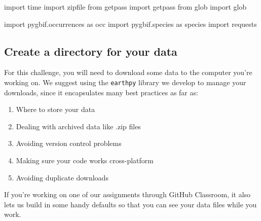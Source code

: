 \documentclass[
]{report}
\newenvironment{Shaded}{\begin{snugshade}}{\end{snugshade}}
\newcommand{\ImportTok}[1]{\textcolor[rgb]{0.00,0.46,0.62}{#1}}
\newcommand{\NormalTok}[1]{\textcolor[rgb]{0.00,0.23,0.31}{#1}}
\providecommand{\tightlist}{%
  \setlength{\itemsep}{0pt}\setlength{\parskip}{0pt}}
\begin{document}
\begin{Shaded}
\begin{Highlighting}[]
\ImportTok{import}\NormalTok{ time}
\ImportTok{import}\NormalTok{ zipfile}
\ImportTok{from}\NormalTok{ getpass }\ImportTok{import}\NormalTok{ getpass}
\ImportTok{from}\NormalTok{ glob }\ImportTok{import}\NormalTok{ glob}

\ImportTok{import}\NormalTok{ pygbif.occurrences }\ImportTok{as}\NormalTok{ occ}
\ImportTok{import}\NormalTok{ pygbif.species }\ImportTok{as}\NormalTok{ species}
\ImportTok{import}\NormalTok{ requests}
\end{Highlighting}
\end{Shaded}

\subsection{Create a directory for your
data}\label{create-a-directory-for-your-data}

For this challenge, you will need to download some data to the computer
you're working on. We suggest using the \texttt{earthpy} library we
develop to manage your downloads, since it encapsulates many best
practices as far as:

\begin{enumerate}
\def\labelenumi{\arabic{enumi}.}
\tightlist
\item
  Where to store your data
\item
  Dealing with archived data like .zip files
\item
  Avoiding version control problems
\item
  Making sure your code works cross-platform
\item
  Avoiding duplicate downloads
\end{enumerate}

If you're working on one of our assignments through GitHub Classroom, it
also lets us build in some handy defaults so that you can see your data
files while you work.
\end{document}
